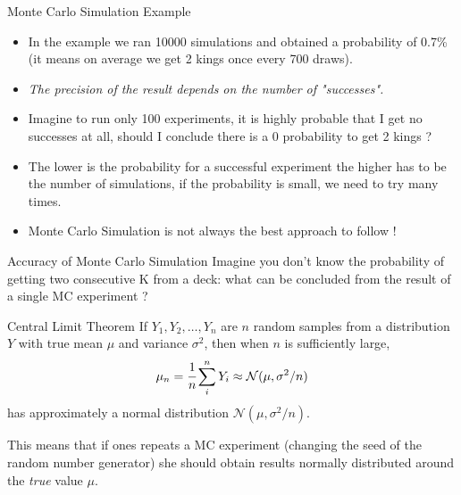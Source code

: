 \documentclass{beamer}
\begin{document}
\begin{frame}{Monte Carlo Simulation Example}
\begin{itemize}
    \item In the example we ran 10000 simulations and obtained a probability of 0.7\% (it means on average we get 2 kings once every 700 draws).
    \item \emph{The precision of the result depends on the number of "successes".}
    \item Imagine to run only 100 experiments, it is highly probable that I get no successes at all, should I conclude there is a 0 probability to get 2 kings ?
    \item The lower is the probability for a successful experiment the higher has to be the number of simulations, if the probability is small, we need to try many times.
    \item Monte Carlo Simulation is not always the best approach to follow !
\end{itemize}
\end{frame}

\begin{frame}{Accuracy of Monte Carlo Simulation}
Imagine you don't know the probability of getting two consecutive K from a deck: what can be concluded from the result of a single MC experiment ?
\begin{block}{Central Limit Theorem}    
If $Y_1, Y_2,\dots, Y_n$ are $n$ random samples from a distribution $Y$ with true mean $\mu$ and variance $\sigma^{2}$, then when $n$ is sufficiently large, 
\begin{equation*}
\mu_n = \cfrac{1}{n}\sum_i^n Y_i \approx \mathcal{N}(\mu, \sigma^2/n)
\end{equation*}
has approximately a normal distribution $\mathcal{N}(\mu, \sigma^2/n)$. 

This means that if ones repeats a MC experiment (changing the seed of the random number generator) she should obtain results normally distributed around the \emph{true} value $\mu$.
\end{block}
\end{frame}
\end{document}
